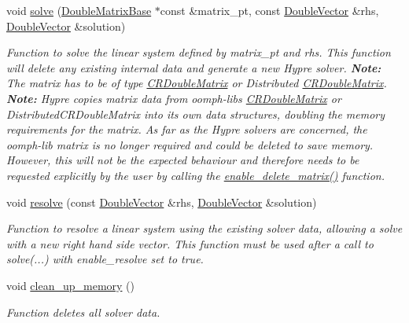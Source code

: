 \begin{DoxyCompactItemize}
void \hyperlink{classoomph_1_1HypreSolver_a11265eed48a54ba7dfb148d226cb2130}{solve} (\hyperlink{classoomph_1_1DoubleMatrixBase}{Double\+Matrix\+Base} $\ast$const \&matrix\+\_\+pt, const \hyperlink{classoomph_1_1DoubleVector}{Double\+Vector} \&rhs, \hyperlink{classoomph_1_1DoubleVector}{Double\+Vector} \&solution)
\begin{DoxyCompactList}\small\item\em Function to solve the linear system defined by matrix\+\_\+pt and rhs. This function will delete any existing internal data and generate a new Hypre solver. {\bfseries Note\+:} The matrix has to be of type \hyperlink{classoomph_1_1CRDoubleMatrix}{C\+R\+Double\+Matrix} or Distributed \hyperlink{classoomph_1_1CRDoubleMatrix}{C\+R\+Double\+Matrix}. {\bfseries Note\+:} Hypre copies matrix data from oomph-\/lib\textquotesingle{}s \hyperlink{classoomph_1_1CRDoubleMatrix}{C\+R\+Double\+Matrix} or Distributed\+C\+R\+Double\+Matrix into its own data structures, doubling the memory requirements for the matrix. As far as the Hypre solvers are concerned, the oomph-\/lib matrix is no longer required and could be deleted to save memory. However, this will not be the expected behaviour and therefore needs to be requested explicitly by the user by calling the \hyperlink{classoomph_1_1HypreSolver_ae917113f255b23448210530b00f55338}{enable\+\_\+delete\+\_\+matrix()} function. \end{DoxyCompactList}\item 
void \hyperlink{classoomph_1_1HypreSolver_a892df4a9377dfa5ec978a74badb61423}{resolve} (const \hyperlink{classoomph_1_1DoubleVector}{Double\+Vector} \&rhs, \hyperlink{classoomph_1_1DoubleVector}{Double\+Vector} \&solution)
\begin{DoxyCompactList}\small\item\em Function to resolve a linear system using the existing solver data, allowing a solve with a new right hand side vector. This function must be used after a call to solve(...) with enable\+\_\+resolve set to true. \end{DoxyCompactList}\item 
void \hyperlink{classoomph_1_1HypreSolver_a5c1a57f1f74c0748a47c1629635ee0fc}{clean\+\_\+up\+\_\+memory} ()
\begin{DoxyCompactList}\small\item\em Function deletes all solver data. \end{DoxyCompactList}\end{DoxyCompactItemize}
